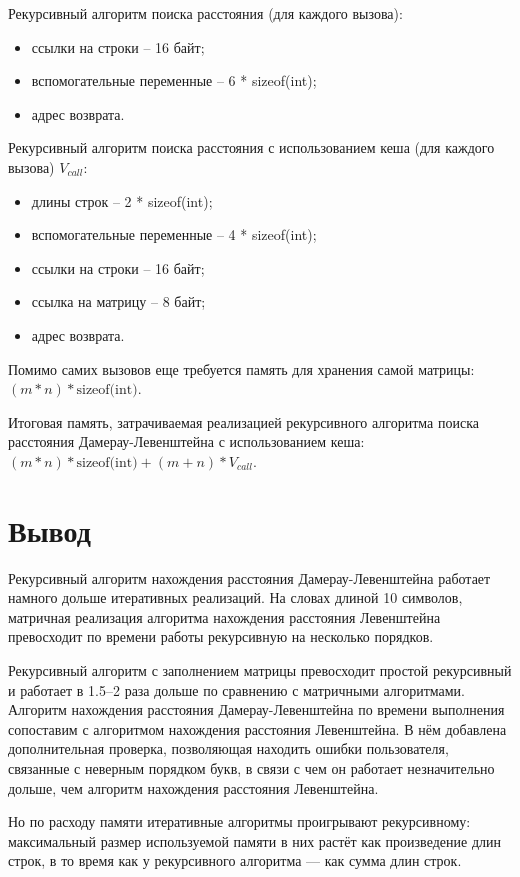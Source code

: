 Рекурсивный алгоритм поиска расстояния (для каждого вызова):
\begin{itemize}
	\item ссылки на строки -- 16 байт;
	\item вспомогательные переменные --  6 * sizeof(int);
	\item адрес возврата.
\end{itemize}

Рекурсивный алгоритм поиска расстояния с использованием кеша (для каждого вызова) $V_{call}$:
	\begin{itemize}
		\item длины строк -- 2 * sizeof(int);
		\item вспомогательные переменные --  4 * sizeof(int);
		\item ссылки на строки -- 16 байт;
		\item ссылка на матрицу -- 8 байт;
		\item адрес возврата.
	\end{itemize}

Помимо самих вызовов еще требуется память для хранения самой матрицы:  
$(m * n) * \text{sizeof(int)}$. 

Итоговая память, затрачиваемая реализацией рекурсивного алгоритма поиска расстояния Дамерау-Левенштейна с использованием кеша:\\
$(m * n) * \text{sizeof(int)} + (m + n) * V_{call}$.

\section*{Вывод}
Рекурсивный алгоритм нахождения расстояния Дамерау-Левенштейна работает намного дольше итеративных реализаций. На словах длиной 10 символов, матричная реализация алгоритма нахождения расстояния Левенштейна превосходит по времени работы рекурсивную на несколько порядков.

Рекурсивный алгоритм с заполнением матрицы превосходит простой рекурсивный и работает в 1.5--2 раза дольше по сравнению с матричными алгоритмами. Алгоритм нахождения расстояния Дамерау-Левенштейна по времени выполнения сопоставим с алгоритмом нахождения расстояния Левенштейна. В нём добавлена дополнительная проверка, позволяющая находить ошибки пользователя, связанные с неверным порядком букв, в связи с чем он работает незначительно дольше, чем алгоритм нахождения расстояния Левенштейна.

Но по расходу памяти итеративные алгоритмы проигрывают рекурсивному: максимальный размер используемой памяти в них растёт как произведение длин строк, в то время как у рекурсивного алгоритма — как сумма длин строк.
